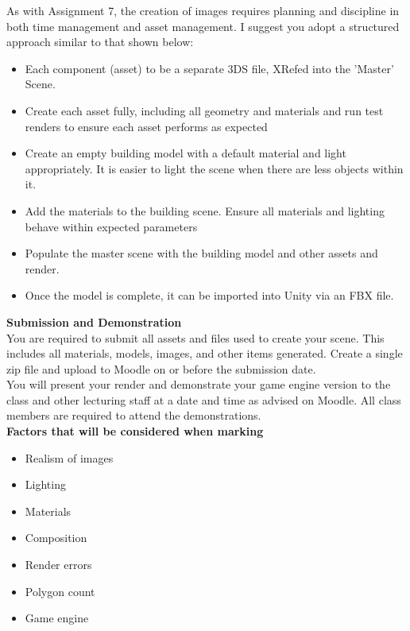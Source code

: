 As with Assignment 7, the creation of images requires planning and discipline in both time management and asset management.  I suggest you adopt a structured approach similar to that shown below:

\begin{itemize}
	\item Each component (asset) to be a separate 3DS file, XRefed into the 'Master' Scene.
	\item Create each asset fully, including all geometry and materials and run test renders to ensure each asset performs as expected
	\item Create an empty building model with a default material and light appropriately.  It is easier to light the scene when there are less objects within it.  
	\item Add the materials to the building scene.  Ensure all materials and lighting behave within expected parameters
	\item Populate the master scene with the building model and other assets and render.
	\item Once the model is complete, it can be imported into Unity via an FBX file.
\end{itemize}

\textbf{Submission and Demonstration}\\

You are required to submit all assets and files used to create your scene.  This includes all materials, models, images, and other items generated.  Create a single zip file and upload to Moodle on or before the submission date.\\

You will present your render and demonstrate your game engine version to the class and other lecturing staff at a date and time as advised on Moodle.  All class members are required to attend the demonstrations.\\


\textbf{Factors that will be considered when marking}\\
\begin{itemize}
	\item Realism of images
	\item Lighting
	\item Materials
	\item Composition
	\item Render errors
	\item Polygon count
	\item Game engine 
\end{itemize}



